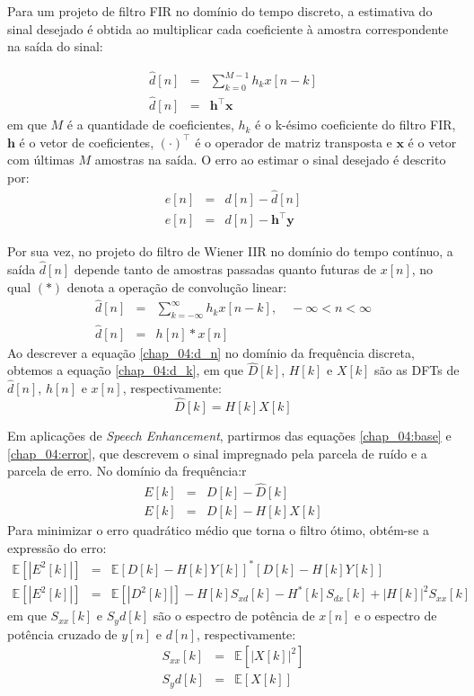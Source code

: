 Para um projeto de filtro FIR no domínio do tempo discreto, a estimativa do
sinal desejado é obtida ao multiplicar cada coeficiente à amostra correspondente
na saída do sinal: 

\begin{eqnarray}
    \hat{d}[n] &=& \sum_{k=0}^{M-1}h_k x[n-k]\\
    \hat{d}[n] &=& \textbf{h}^\top \textbf{x}
    \end{eqnarray}
em que $M$ é a quantidade de coeficientes, $h_k$ é o k-ésimo coeficiente do
filtro FIR, $\textbf{h}$ é o vetor de coeficientes, $(\cdot) ^\top$ é o operador
de matriz transposta e $\mathbf{x}$ é o vetor com últimas $M$ amostras na saída.
O erro ao estimar o sinal desejado é descrito por:
\begin{eqnarray}
  \label{chap_04:error}  e[n] &=& d[n] - \hat{d}[n]\\
    e[n] &=& d[n] - \textbf{h}^\top \textbf{y}
\end{eqnarray}


Por sua vez, no projeto do filtro de Wiener IIR no domínio do tempo contínuo, a
saída $\hat{d}[n]$ depende tanto de amostras passadas quanto futuras de $x[n]$,
no qual $(*)$ denota a operação de convolução linear:
\begin{eqnarray}
    \hat{d}[n] &=& \sum_{k=-\infty}^{\infty}h_k x[n-k], \quad -\infty < n < \infty\\
    \label{chap_04:d_n}\hat{d}[n] &=& h[n] \ast x[n]
\end{eqnarray}
Ao descrever a equação \ref{chap_04:d_n} no domínio da frequência discreta,
obtemos a equação \ref{chap_04:d_k}, em que $\hat{D}[k]$, $H[k]$ e
$X[k]$ são as DFTs de $\hat{d}[n]$, $h[n]$ e $x[n]$, respectivamente:
\begin{equation} \label{chap_04:d_k}
    \hat{D}[k] = H[k] X[k]
\end{equation}

Em aplicações de \textit{Speech Enhancement}, partirmos das equações
\ref{chap_04:base} e \ref{chap_04:error}, que descrevem o sinal impregnado pela
parcela de ruído e a parcela de erro. No domínio da frequência:r
\begin{eqnarray}
    E[k] &=& D[k] - \hat{D}[k] \\
    E[k] &=& D[k] - H[k]X[k]
\end{eqnarray}
Para minimizar o erro quadrático médio que torna o filtro ótimo, obtém-se a expressão do erro:
\begin{eqnarray}
    \mathbb{E}[|E^2[k]|] &=& \mathbb{E}[D[k]-H[k]Y[k]]^\ast [D[k]-H[k]Y[k]] \\
    \mathbb{E}[|E^2[k]|] &=& \mathbb{E}[|D^2[k]|] - H[k]S_{xd}[k] - H^\ast[k]S_{dx}[k] + |H[k]|^2S_{xx}[k]
\end{eqnarray}
em que $S_{xx}[k]$ e $S_yd[k]$ são o espectro de potência de $x[n]$ e o espectro
de potência cruzado de $y[n]$ e $d[n]$, respectivamente:
\begin{eqnarray}
    S_{xx}[k] &=& \mathbb{E}[|X[k]|^2] \\
    S_yd[k] &=& \mathbb{E}[X[k   ]]
\end{eqnarray}

